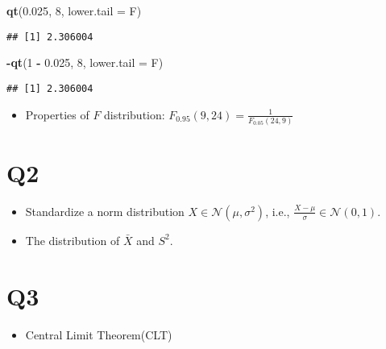 \documentclass[
]{book}
\newenvironment{Shaded}{\begin{snugshade}}{\end{snugshade}}
\newcommand{\DataTypeTok}[1]{\textcolor[rgb]{0.13,0.29,0.53}{#1}}
\newcommand{\DecValTok}[1]{\textcolor[rgb]{0.00,0.00,0.81}{#1}}
\newcommand{\FloatTok}[1]{\textcolor[rgb]{0.00,0.00,0.81}{#1}}
\newcommand{\KeywordTok}[1]{\textcolor[rgb]{0.13,0.29,0.53}{\textbf{#1}}}
\newcommand{\NormalTok}[1]{#1}
\newcommand{\OperatorTok}[1]{\textcolor[rgb]{0.81,0.36,0.00}{\textbf{#1}}}
\newcommand{\StringTok}[1]{\textcolor[rgb]{0.31,0.60,0.02}{#1}}
\providecommand{\tightlist}{%
  \setlength{\itemsep}{0pt}\setlength{\parskip}{0pt}}
\theoremstyle{definition}
\theoremstyle{definition}
\theoremstyle{definition}
\theoremstyle{remark}
\begin{document}
\begin{Shaded}
\begin{Highlighting}[]
\KeywordTok{qt}\NormalTok{(}\FloatTok{0.025}\NormalTok{, }\DecValTok{8}\NormalTok{, }\DataTypeTok{lower.tail =}\NormalTok{ F)}
\end{Highlighting}
\end{Shaded}

\begin{verbatim}
## [1] 2.306004
\end{verbatim}

\begin{Shaded}
\begin{Highlighting}[]
\OperatorTok{{-}}\KeywordTok{qt}\NormalTok{(}\DecValTok{1} \OperatorTok{{-}}\StringTok{ }\FloatTok{0.025}\NormalTok{, }\DecValTok{8}\NormalTok{, }\DataTypeTok{lower.tail =}\NormalTok{ F)}
\end{Highlighting}
\end{Shaded}

\begin{verbatim}
## [1] 2.306004
\end{verbatim}

\begin{itemize}
\tightlist
\item
  Properties of \(F\) distribution: \(F_{0.95}(9,24)= \frac{1}{F_{0.05}(24,9)}\)
\end{itemize}

\hypertarget{q2}{%
\section{Q2}\label{q2}}

\begin{itemize}
\item
  Standardize a norm distribution \(X\in\mathcal{N}(\mu,\sigma^2)\), i.e., \(\frac{X-\mu}{\sigma}\in\mathcal{N}(0,1)\).
\item
  The distribution of \(\bar X\) and \(S^2\).
\end{itemize}

\hypertarget{q3}{%
\section{Q3}\label{q3}}

\begin{itemize}
\tightlist
\item
  Central Limit Theorem(CLT)
\end{itemize}
\end{document}
